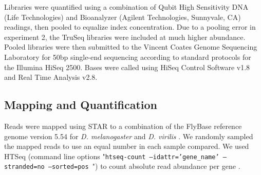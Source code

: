 Libraries were quantified using a combination of Qubit High Sensitivity DNA (Life Technologies) and Bioanalyzer (Agilent Technologies, Sunnyvale, CA) readings, then pooled to equalize index concentration. Due to a pooling error in experiment 2, the TruSeq libraries were included at much higher abundance. Pooled libraries were then submitted to the Vincent Coates Genome Sequencing Laboratory for 50bp single-end sequencing according to standard protocols for the Illumina HiSeq 2500. Bases were called using HiSeq Control Software v1.8 and Real Time Analysis v2.8.


\subsection{Mapping and Quantification}


Reads were mapped using STAR \cite{Dobin:2012fg} to a combination of the FlyBase reference genome version 5.54 for {\em D. melanogaster} and {\em D. virilis} \cite{McQuilton:2011iq}. We randomly sampled the mapped reads to use an equal number in each sample compared. We used HTSeq (command line options "{\tt htseq-count --idattr='gene\_name' --stranded=no --sorted=pos }") to count absolute read abundance per gene \cite{Anders_2014}.
